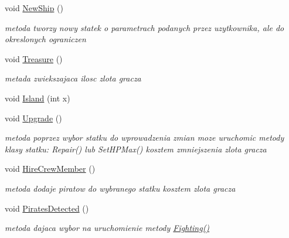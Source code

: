 \begin{DoxyCompactItemize}
\mbox{\label{class_player_a235e967a3d74eeb64f983cf8a6db3272}} 
void \hyperlink{class_player_a235e967a3d74eeb64f983cf8a6db3272}{New\+Ship} ()
\begin{DoxyCompactList}\small\item\em metoda tworzy nowy statek o parametrach podanych przez uzytkownika, ale do okreslonych ograniczen \end{DoxyCompactList}\item 
\mbox{\label{class_player_adeae433538eda671f1cbaaf3fce54380}} 
void \hyperlink{class_player_adeae433538eda671f1cbaaf3fce54380}{Treasure} ()
\begin{DoxyCompactList}\small\item\em metada zwiekszajaca ilosc zlota gracza \end{DoxyCompactList}\item 
void \hyperlink{class_player_afc2b87dc8abe8dfc5ea7f62503e18810}{Island} (int x)
\item 
\mbox{\label{class_player_af928618a2b86138724fe0a523d8aa213}} 
void \hyperlink{class_player_af928618a2b86138724fe0a523d8aa213}{Upgrade} ()
\begin{DoxyCompactList}\small\item\em metoda poprzez wybor statku do wprowadzenia zmian moze uruchomic metody klasy statku\+: Repair() lub Set\+H\+P\+Max() kosztem zmniejszenia zlota gracza \end{DoxyCompactList}\item 
\mbox{\label{class_player_a9a4c059e7aa94a6ee4152351af9d9edd}} 
void \hyperlink{class_player_a9a4c059e7aa94a6ee4152351af9d9edd}{Hire\+Crew\+Member} ()
\begin{DoxyCompactList}\small\item\em metoda dodaje piratow do wybranego statku kosztem zlota gracza \end{DoxyCompactList}\item 
\mbox{\label{class_player_a305da8fa45422dcd8fe3d5f92e4c6c7f}} 
void \hyperlink{class_player_a305da8fa45422dcd8fe3d5f92e4c6c7f}{Pirates\+Detected} ()
\begin{DoxyCompactList}\small\item\em metoda dajaca wybor na uruchomienie metody \hyperlink{class_player_aea0f1b80c9c3e2ea3beede26b9b2b51a}{Fighting()} \end{DoxyCompactList}\item 

\end{DoxyCompactItemize}
